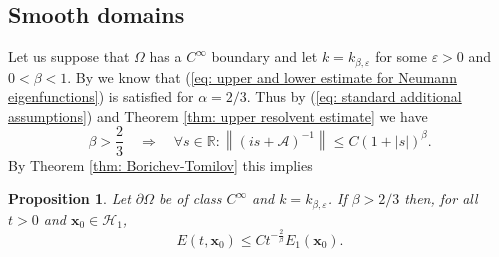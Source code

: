 \documentclass{amsart}
\newcommand{\abs}[1]{\left|#1\right|}
\newcommand{\norm}[1]{\left\| #1 \right\|}
\newcommand{\A}{\mathcal{A}}
\newcommand{\xnice}{\mathbf{x}}
\newcommand{\Ho}{\mathcal{H}}
\newcommand{\R}{\mathbb{R}}
\newtheorem{Proposition}[Theorem]{Proposition}
\begin{document}
\subsection{Smooth domains}
Let us suppose that $\Omega$ has a $C^{\infty}$ boundary and let $k=k_{\beta,\varepsilon}$ for some $\varepsilon>0$ and $0<\beta<1$. By \cite{BarnettHassellTacy2016} we know that (\ref{eq: upper and lower estimate for Neumann eigenfunctions}) is satisfied for $\alpha=2/3$. Thus by (\ref{eq: standard additional assumptions}) and Theorem \ref{thm: upper resolvent estimate} we have 
\begin{equation}
 \beta > \frac{2}{3} \quad \Longrightarrow \quad \forall s\in\R: \norm{(is+\A)^{-1}}\leq C (1+\abs{s})^{\beta}.
\end{equation}
By Theorem \ref{thm: Borichev-Tomilov} this implies
\begin{Proposition}\label{thm: arbitrary smooth domains}
 Let $\partial\Omega$ be of class $C^{\infty}$ and $k=k_{\beta,\varepsilon}$. If $\beta>2/3$ then, for all $t>0$ and $\xnice_0\in\Ho_1$,
 \begin{equation}\nonumber
  E(t, \xnice_0) \leq C t^{-\frac{2}{\beta}} E_1(\xnice_0).
 \end{equation}
\end{Proposition}
\end{document}
